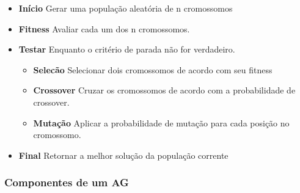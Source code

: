 \documentclass[12pt]{article}
\providecommand{\tightlist}{%
\setlength{\itemsep}{0pt}\setlength{\parskip}{0pt}}
\begin{document}
\begin{itemize}
\tightlist
\item
  \textbf{Início} Gerar uma população aleatória de n cromossomos
\item
  \textbf{Fitness} Avaliar cada um dos n cromossomos.
\item
  \textbf{Testar} Enquanto o critério de parada não for verdadeiro.

  \begin{itemize}
  \tightlist
  \item
    \textbf{Selecão} Selecionar dois cromossomos de acordo com seu
    fitness
  \item
    \textbf{Crossover} Cruzar os cromossomos de acordo com a
    probabilidade de crossover.
  \item
    \textbf{Mutação} Aplicar a probabilidade de mutação para cada
    posição no cromossomo.
  \end{itemize}
\item
  \textbf{Final} Retornar a melhor solução da população corrente
\end{itemize}

\hypertarget{componentes-de-um-ag}{%
\subsubsection{Componentes de um AG}\label{componentes-de-um-ag}}
\end{document}

